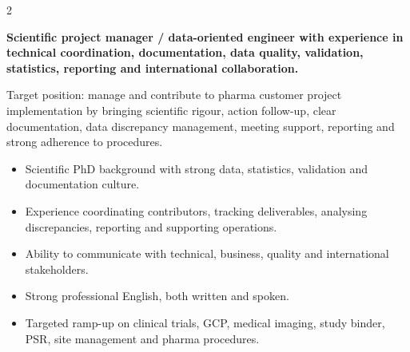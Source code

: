 \documentclass[8pt,a4paper,ragged2e,withhyper]{altacv}
\begin{document}
\begin{paracol}{2}
\switchcolumn


\textbf{Scientific project manager / data-oriented engineer with experience in technical coordination, documentation, data quality, validation, statistics, reporting and international collaboration.}

Target position: manage and contribute to pharma customer project implementation by bringing scientific rigour, action follow-up, clear documentation, data discrepancy management, meeting support, reporting and strong adherence to procedures.

\begin{itemize}
  \item Scientific PhD background with strong data, statistics, validation and documentation culture.
  \item Experience coordinating contributors, tracking deliverables, analysing discrepancies, reporting and supporting operations.
  \item Ability to communicate with technical, business, quality and international stakeholders.
  \item Strong professional English, both written and spoken.
  \item Targeted ramp-up on clinical trials, GCP, medical imaging, study binder, PSR, site management and pharma procedures.
\end{itemize}


\divider
{}
\divider

\medskip



\divider


\divider


\divider





\end{paracol}
\end{document}
